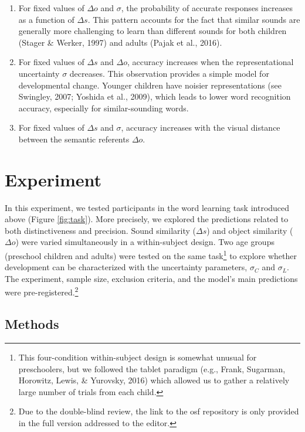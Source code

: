 \documentclass[english,,man]{apa6}
\let\rmarkdownfootnote\footnote%
\def\footnote{\protect\rmarkdownfootnote}
\begin{document}
\begin{enumerate}
\def\labelenumi{\arabic{enumi})}
\item
  For fixed values of \(\Delta o\) and \(\sigma\), the probability of accurate responses increases as a function of \(\Delta s\). This pattern accounts for the fact that similar sounds are generally more challenging to learn than different sounds for both children (Stager \& Werker, 1997) and adults (Pajak et al., 2016).
\item
  For fixed values of \(\Delta s\) and \(\Delta o\), accuracy increases when the representational uncertainty \(\sigma\) decreases. This observation provides a simple model for developmental change. Younger children have noisier representations (see Swingley, 2007; Yoshida et al., 2009), which leads to lower word recognition accuracy, especially for similar-sounding words.
\item
  For fixed values of \(\Delta s\) and \(\sigma\), accuracy increases with the visual distance between the semantic referents \(\Delta o\).
\end{enumerate}

\hypertarget{experiment}{%
\section{Experiment}\label{experiment}}

In this experiment, we tested participants in the word learning task introduced above (Figure \ref{fig:task}). More precisely, we explored the predictions related to both distinctiveness and precision. Sound similarity (\(\Delta s\)) and object similarity (\(\Delta o\)) were varied simultaneously in a within-subject design. Two age groups (preschool children and adults) were tested on the same task\footnote{This four-condition within-subject design is somewhat unusual for preschoolers, but we followed the tablet paradigm (e.g., Frank, Sugarman, Horowitz, Lewis, \& Yurovsky, 2016) which allowed us to gather a relatively large number of trials from each child.} to explore whether development can be characterized with the uncertainty parameters, \(\sigma_C\) and \(\sigma_L\). The experiment, sample size, exclusion criteria, and the model's main predictions were pre-registered.\footnote{Due to the double-blind review, the link to the osf repository is only provided in the full version addressed to the editor.}

\hypertarget{methods}{%
\subsection{Methods}\label{methods}}
\end{document}
